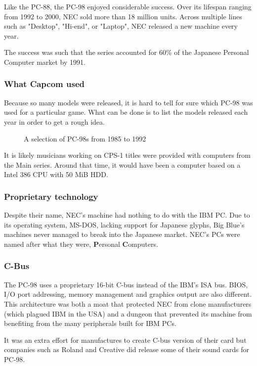 Like the PC-88, the PC-98 enjoyed considerable success. Over its lifespan ranging from 1992 to 2000, NEC sold more than 18 million units. Across multiple lines such as "Desktop", "Hi-end", or "Laptop", NEC released a new machine every year\cite{9800lines}. 

The success was such that the series accounted for 60\% of the Japanese Personal Computer market by 1991. 



\subsubsection{What Capcom used}
Because so many models were released, it is hard to tell for sure which PC-98 was used for a particular game. What can be done is to list the models released each year in order to get a rough idea.

\begin{figure}[H]
\caption*{A selection of PC-98s from 1985 to 1992}
\end{figure}

It is likely musicians working on CPS-1 titles were provided with computers from the Main series. Around that time, it would have been a computer based on a Intel 386 CPU with 50 MiB HDD.


\subsubsection{Proprietary technology}

Despite their name, NEC's machine had nothing to do with the IBM PC. Due to its operating system, MS-DOS, lacking support for Japanese glyphs, Big Blue’s machines never managed to break into the
Japanese market. NEC's PCs were named after what they were, \textbf{P}ersonal \textbf{C}omputers.


\subsubsection{C-Bus}
The PC-98 uses a proprietary 16-bit C-bus instead of the IBM's ISA bus. BIOS, I/O port addressing, memory management and graphics output are also different. This architecture was both a moat that protected NEC from clone manufacturers (which plagued IBM in the USA) and a dungeon that prevented its machine from benefiting from the many peripherals built for IBM PCs.


It was an extra effort for manufactures to create C-bus version of their card but companies such as Roland and Creative did release some of their sound cards for PC-98.

